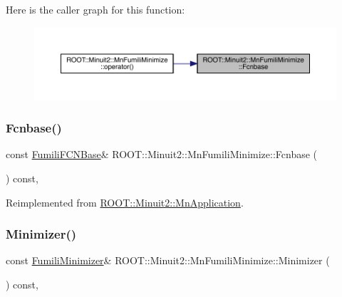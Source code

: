 Here is the caller graph for this function\+:\nopagebreak
\begin{figure}[H]
\begin{center}
\leavevmode
\includegraphics[width=350pt]{dc/d88/classROOT_1_1Minuit2_1_1MnFumiliMinimize_a4540fd0311c15810965864988d4c70d1_icgraph}
\end{center}
\end{figure}
\mbox{\label{classROOT_1_1Minuit2_1_1MnFumiliMinimize_a4540fd0311c15810965864988d4c70d1}} 
\subsubsection{\texorpdfstring{Fcnbase()}{Fcnbase()}\hspace{0.1cm}{\footnotesize\ttfamily [2/2]}}
{\footnotesize\ttfamily const \mbox{\hyperlink{classROOT_1_1Minuit2_1_1FumiliFCNBase}{Fumili\+F\+C\+N\+Base}}\& R\+O\+O\+T\+::\+Minuit2\+::\+Mn\+Fumili\+Minimize\+::\+Fcnbase (\begin{DoxyParamCaption}{ }\end{DoxyParamCaption}) const\hspace{0.3cm}{\ttfamily [inline]}, {\ttfamily [virtual]}}



Reimplemented from \mbox{\hyperlink{classROOT_1_1Minuit2_1_1MnApplication_af4eb3fe4927d3a8e0efcd5c6b7100881}{R\+O\+O\+T\+::\+Minuit2\+::\+Mn\+Application}}.

\mbox{\label{classROOT_1_1Minuit2_1_1MnFumiliMinimize_a96eb0cf96ae7ec874f912b6d2b3e7990}} 
\subsubsection{\texorpdfstring{Minimizer()}{Minimizer()}\hspace{0.1cm}{\footnotesize\ttfamily [1/2]}}
{\footnotesize\ttfamily const \mbox{\hyperlink{classROOT_1_1Minuit2_1_1FumiliMinimizer}{Fumili\+Minimizer}}\& R\+O\+O\+T\+::\+Minuit2\+::\+Mn\+Fumili\+Minimize\+::\+Minimizer (\begin{DoxyParamCaption}{ }\end{DoxyParamCaption}) const\hspace{0.3cm}{\ttfamily [inline]}, {\ttfamily [virtual]}}



